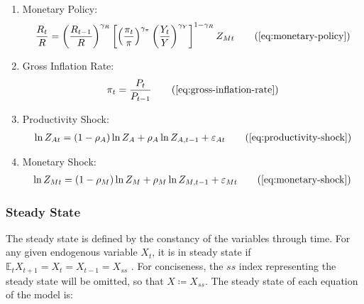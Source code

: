 \documentclass[
thesis.tex
]{subfiles}
\begin{document}
{\begin{itemize}
\begin{enumerate}
				\item Monetary Policy:
				\begin{align}
					\frac{R_t}{R} = \left( 
					\frac{R_{t-1}}{R} \right)^{\gamma_R} \left[ \left(
					\frac{\pi_t}{\pi} \right)^{\gamma_\pi} \left( 
					\frac{Y_t}{Y} \right)^{\gamma_Y} \right]^{1-\gamma_R} Z_{Mt}
					\tag{\ref{eq:monetary-policy}}
				\end{align}
				
				\item Gross Inflation Rate:
				\begin{align}
					\pi_t = \frac{P_t}{P_{t-1}}
					\tag{\ref{eq:gross-inflation-rate}}
				\end{align}
				
				\item Productivity Shock:
				\begin{align}
					\ln{Z_{At}} = (1-\rho_A)\ln{Z_A} + \rho_A\ln{Z_{A,t-1}} + \varepsilon_{At}
					\tag{\ref{eq:productivity-shock}}
				\end{align}
				
				\item Monetary Shock:
				\begin{align}
					\ln{Z_{Mt}} = (1-\rho_M)\ln{Z_{M}} + \rho_M\ln{Z_{M,t-1}} + \varepsilon_{Mt}
					\tag{\ref{eq:monetary-shock}}
				\end{align}
				
			\end{enumerate}
			
		\end{itemize}
		
	} %
	
	
	
	\subsubsection{Steady State}
	
	The steady state is defined by the constancy of the variables through time. For any given endogenous variable $X_t$, it is in steady state if $\mathbb{E}_t X_{t+1} = X_t = X_{t-1} = X_{ss}$ \cite[p.41]{costa_junior_understanding_2016}. For conciseness, the $ss$ index representing the steady state will be omitted, so that $X \coloneq X_{ss}$. The steady state of each equation of the model is:
	
\end{document}
